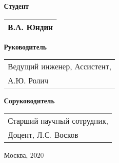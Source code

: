 \begin{multicols}{2}
    \noindent
    \textbf{Студент}
    
    \vspace{10.5mm}
    
    \noindent
    \begin{tabularx}{\linewidth}{l}
        В.А. Юндин \\
        \hline
    \end{tabularx}
    
    \columnbreak
    
    \noindent
    \textbf{Руководитель}
    
    \vspace{4mm}
    
    \noindent %
    \begin{tabularx}{\linewidth}{l}
        Ведущий инженер, Ассистент,\\А.Ю. Ролич\\
        \hline
    \end{tabularx}

    \vspace{8mm}

    \noindent
    \textbf{Соруководитель}
    
    \vspace{4mm}
    
    \noindent %
    \begin{tabularx}{\linewidth}{l}
        Старший научный сотрудник,\\Доцент, Л.С. Восков\\
        \hline
    \end{tabularx}
\end{multicols}

\vfill
\begin{center}Москва, 2020\end{center}

\restoregeometry
\newpage
